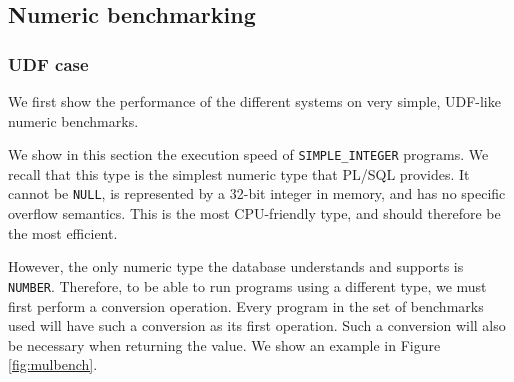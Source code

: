 \documentclass[twoside,11pt,a4paper]{article}
\newcommand{\pls}[1]{\texttt{#1}}
\newcommand{\plstype}[1]{\pls{#1}}
\newcommand{\oranum}{\plstype{NUMBER}}
\newcommand{\simpleint}{\plstype{SIMPLE\_INTEGER}}
\newcommand{\plsnull}{\pls{NULL}}
\newcommand{\benchsystem}[1]{\textsf{#1}}
\newcommand{\ncpg}{\benchsystem{ncomp-pragma}}
\begin{document}
\subsection{Numeric benchmarking}


\subsubsection{UDF case}

We first show the performance of the different systems on very simple, UDF-like numeric benchmarks.

We show in this section the execution speed of \simpleint{} programs. We recall that this type is the simplest numeric type that PL/SQL provides. It cannot be \plsnull{}, is represented by a 32-bit integer in memory, and has no specific overflow semantics. This is the most CPU-friendly type, and should therefore be the most efficient.

However, the only numeric type the database understands and supports is \oranum{}. Therefore, to be able to run programs using a different type, we must first perform a conversion operation. Every program in the set of benchmarks used will have such a conversion as its first operation. Such a conversion will also be necessary when returning the value. We show an example in Figure \ref{fig:mulbench}.
\end{document}
